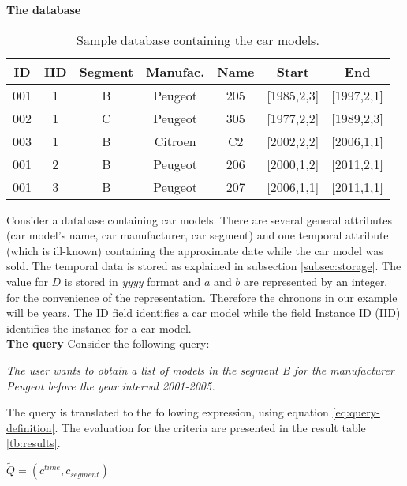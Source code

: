 \begin{example} 

\textbf{The database}
\begin{table}[ht]
\caption{Sample database containing the car models.}
\centering
\begin{tabular}{c c c c c c c}
\hline
ID & IID & Segment & Manufac. & Name & Start & End  \\ [0.5ex]
\hline
001 & 1 & B & Peugeot & 205 & [1985,2,3] & [1997,2,1] \\
002 & 1 & C & Peugeot & 305 & [1977,2,2] & [1989,2,3] \\
003 & 1 & B & Citroen & C2 & [2002,2,2] & [2006,1,1] \\
001 & 2 & B & Peugeot & 206 & [2000,1,2] & [2011,2,1] \\
001 & 3 & B & Peugeot & 207 & [2006,1,1] & [2011,1,1]\\
\hline
\end{tabular}
\label{tb:car-models}
\end{table}


Consider a database containing car models. There are several general attributes (car model's name, car manufacturer, car segment) and one temporal attribute (which is ill-known) containing the approximate date while the car model was sold. The temporal data is stored as explained in subsection \ref{subsec:storage}. The value for $D$ is stored in \emph{yyyy} format and $a$ and $b$ are represented by an integer, for the convenience of the representation. Therefore the chronons in our example will be years. The ID field identifies a car model while the field Instance ID (IID) identifies the instance for a car model. \\

\textbf{The query}
Consider the following query:

\emph{The user wants to obtain a list of models in the segment B for the manufacturer Peugeot before the year interval 2001-2005.}

The query is translated to the following expression, using equation \eqref{eq:query-definition}. The evaluation for the criteria are presented in the result table \ref{tb:results}.

\begin{center}
$\tilde{Q} = \left(  c^{time}, c_{segment} \right)$
\end{center}


\end{example}
